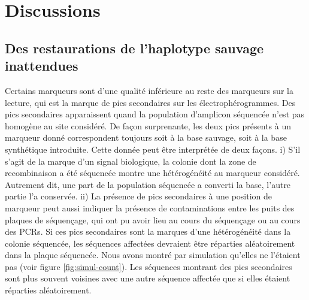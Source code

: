 \section{Discussions}
\label{sec:discussions}

\subsection{Des restaurations de l'haplotype sauvage inattendues}
\label{subsec:discu-restaur}

Certains marqueurs sont d'une qualité inférieure au reste des marqueurs sur la
lecture, qui est la marque de pics secondaires sur les électrophérogrammes.
Des pics secondaires apparaissent quand la population d'amplicon séquencée n'est
pas homogène au site considéré. De façon surprenante, les deux pics présents à
un marqueur donné correspondent toujours soit à la base sauvage, soit à la base
synthétique introduite. Cette donnée peut être interprétée de deux façons. i)
S'il s'agit de la marque d'un signal biologique, la colonie dont la zone de
recombinaison a été séquencée montre une hétérogénéité au marqueur considéré.
Autrement dit, une part de la population séquencée a converti la base, l'autre
partie l'a conservée. ii) La présence de pics secondaires à une position de
marqueur peut aussi indiquer la présence de contaminations entre les puits des
plaques de séquençage, qui ont pu avoir lieu au cours du séquençage ou au cours
des PCRs. Si ces pics secondaires sont la marques d'une hétérogénéité dans la
colonie séquencée, les séquences affectées devraient être réparties
aléatoirement dans la plaque séquencée. Nous avons montré par simulation
qu'elles ne l'étaient pas (voir figure \ref{fig:simul-count}). Les séquences
montrant des pics secondaires sont plus souvent voisines avec une autre séquence
affectée que si elles étaient réparties aléatoirement.





